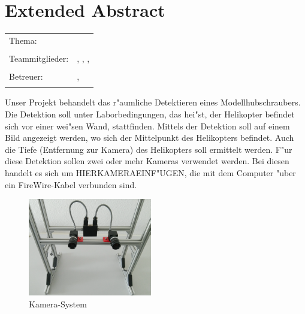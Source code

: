 \chapter*{Extended Abstract}

\begin{center}
	\begingroup
	\renewcommand*{\arraystretch}{1}
	{\makeatletter	
		\begin{tabular}{p{3.2cm}p{9.6cm}}
			Thema: & \thema \\
			& \\
			Teammitglieder: & \verfasserA, \verfasserB, 
			\verfasserC, \verfasserD\\
			& \\
			Betreuer: & \hoschschule \newline \institut \newline \prueferA, \prueferB \\
			& \\
		\end{tabular}
		
		\makeatother}
	\endgroup
\end{center}

\bigskip

\noindent
Unser Projekt behandelt das r"aumliche Detektieren eines Modellhubschraubers. Die Detektion soll unter Laborbedingungen, das hei"st, der Helikopter befindet sich vor einer wei"sen Wand, stattfinden. Mittels der Detektion soll auf einem Bild angezeigt werden, wo sich der Mittelpunkt des Helikopters befindet. Auch die Tiefe (Entfernung zur Kamera) des Helikopters soll ermittelt werden. F"ur diese Detektion sollen zwei oder mehr Kameras verwendet werden. Bei diesen handelt es sich um HIERKAMERAEINF"UGEN, die mit dem Computer "uber ein FireWire-Kabel verbunden sind.\newline

\begin{figure}[H]
	\includegraphics[scale=1.5]{bilder/camerasystem}
	\caption[Kamera-System]{Kamera-System}
\end{figure}

